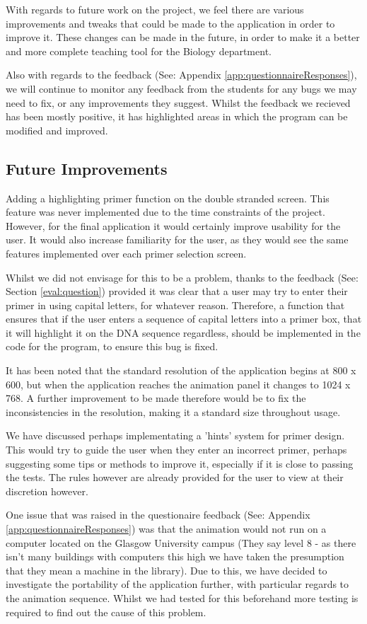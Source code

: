 With regards to future work on the project, we feel there are various improvements and tweaks that could be made to the application in order to improve it. These changes can be made in the future, in order to make it a better and more complete teaching tool for the Biology department.

Also with regards to the feedback (See: Appendix \ref{app:questionnaireResponses}), we will continue to monitor any feedback from the students for any bugs we may need to fix, or any improvements they suggest. Whilst the feedback we recieved has been mostly positive, it has highlighted areas in which the program can be modified and improved.

\subsection{Future Improvements}

Adding a highlighting primer function on the double stranded screen. This feature was never implemented due to the time constraints of the project. However, for the final application it would certainly improve usability for the user. It would also increase familiarity for the user, as they would see the same features implemented over each primer selection screen.

Whilst we did not envisage for this to be a problem, thanks to the feedback (See: Section \ref{eval:question}) provided it was clear that a user may try to enter their primer in using capital letters, for whatever reason. Therefore, a function that ensures that if the user enters a sequence of capital letters into a primer box, that it will highlight it on the DNA sequence regardless, should be implemented in the code for the program, to ensure this bug is fixed.

It has been noted that the standard resolution of the application begins at 800 x 600, but when the application reaches the animation panel it changes to 1024 x 768. A further improvement to be made therefore would be to fix the inconsistencies in the resolution, making it a standard size throughout usage.

We have discussed perhaps implementating a 'hints' system for primer design. This would try to guide the user when they enter an incorrect primer, perhaps suggesting some tips or methods to improve it, especially if it is close to passing the tests. The rules however are already provided for the user to view at their discretion however.

One issue that was raised in the questionaire feedback (See: Appendix \ref{app:questionnaireResponses}) was that the animation would not run on a computer located on the Glasgow University campus (They say level 8 - as there isn't many buildings with computers this high we have taken the presumption that they mean a machine in the library). Due to this, we have decided to investigate the portability of the application further, with particular regards to the animation sequence. Whilst we had tested for this beforehand more testing is required to find out the cause of this problem.

